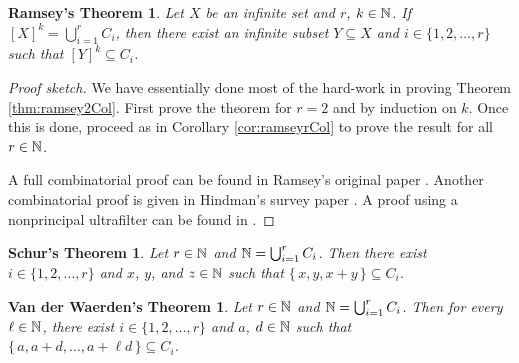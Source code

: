 \documentclass[12pt]{article}
\theoremstyle{plain}
\newtheorem*{schur}{Schur's Theorem}
\newtheorem*{vdw}{Van der Waerden's Theorem}
\newtheorem*{ramsey}{Ramsey's Theorem}
\begin{document}
\begin{ramsey}
  Let $X$ be an infinite set and $r$, $k \in \mathbb{N}$.
  If $[X]^k = \bigcup_{i=1}^r C_i$, then there exist an infinite subset
  $Y \subseteq X$ and $i \in \{1, 2, \ldots, r\}$ such that $[Y]^k
  \subseteq C_i$.
\end{ramsey}
\begin{proof}[Proof sketch]
  We have essentially done most of the hard-work in proving Theorem
  \ref{thm:ramsey2Col}. 
  First prove the theorem for $r = 2$ and by induction on $k$.
  Once this is done, proceed as in Corollary \ref{cor:ramseyrCol} to
  prove the result for all $r \in \mathbb{N}$.

  A full combinatorial proof can be found in Ramsey's original paper
  \cite[Theorem A]{Ramsey:1930uq}. Another combinatorial proof is
  given in Hindman's survey paper \cite[Theorem ??]{Hindman:1979fk}.
  A proof using a nonprincipal ultrafilter can be found in
  \cite[Theorem 18.2]{Hindman:1998fk}.
\end{proof}

\begin{schur}
  Let $r \in \mathbb{N}$ and $\mathbb{N} = \bigcup_{i=1}^r C_i$.
  Then there exist $i \in \{1, 2, \ldots, r\}$ and $x$, $y$, and $z
  \in \mathbb{N}$ such that $\{\, x, y, x+y \,\} \subseteq C_i$.
\end{schur}

\begin{vdw}
  Let $r \in \mathbb{N}$ and $\mathbb{N} = \bigcup_{i=1}^r C_i$.
  Then for every $\ell \in \mathbb{N}$, there exist $i \in \{1, 2, \ldots,
  r\}$ and $a$, $d \in \mathbb{N}$ such that $\{\, a, a+d, \ldots, a+\ell d
  \,\} \subseteq C_i$.
\end{vdw}



\end{document}

